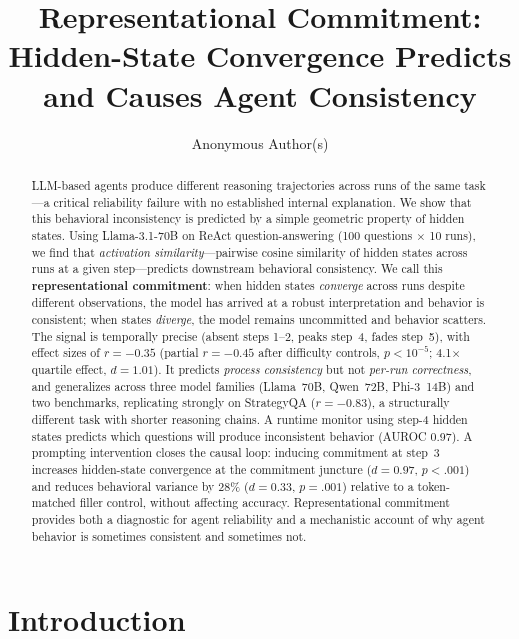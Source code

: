 \documentclass{article}
\title{Representational Commitment: \\ Hidden-State Convergence Predicts and Causes Agent Consistency}
\author{Anonymous Author(s)}
\begin{document}
\ifcolmsubmission
\linenumbers
\fi

\maketitle

\begin{abstract}
LLM-based agents produce different reasoning trajectories across runs of the same task---a critical reliability failure with no established internal explanation. We show that this behavioral inconsistency is predicted by a simple geometric property of hidden states. Using Llama-3.1-70B on ReAct question-answering (100 questions $\times$ 10 runs), we find that \emph{activation similarity}---pairwise cosine similarity of hidden states across runs at a given step---predicts downstream behavioral consistency. We call this \textbf{representational commitment}: when hidden states \emph{converge} across runs despite different observations, the model has arrived at a robust interpretation and behavior is consistent; when states \emph{diverge}, the model remains uncommitted and behavior scatters. The signal is temporally precise (absent steps 1--2, peaks step~4, fades step~5), with effect sizes of $r = -0.35$ (partial $r = -0.45$ after difficulty controls, $p < 10^{-5}$; 4.1$\times$ quartile effect, $d = 1.01$). It predicts \emph{process consistency} but not \emph{per-run correctness}, and generalizes across three model families (Llama~70B, Qwen~72B, Phi-3~14B) and two benchmarks, replicating strongly on StrategyQA ($r = -0.83$), a structurally different task with shorter reasoning chains. A runtime monitor using step-4 hidden states predicts which questions will produce inconsistent behavior (AUROC 0.97). A prompting intervention closes the causal loop: inducing commitment at step~3 increases hidden-state convergence at the commitment juncture ($d = 0.97$, $p < .001$) and reduces behavioral variance by 28\% ($d = 0.33$, $p = .001$) relative to a token-matched filler control, without affecting accuracy. Representational commitment provides both a diagnostic for agent reliability and a mechanistic account of why agent behavior is sometimes consistent and sometimes not.
\end{abstract}

\section{Introduction}
\end{document}
